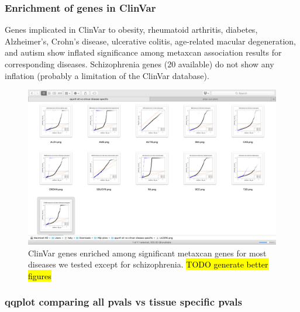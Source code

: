 \documentclass[10pt]{article}
\begin{document}


\subsubsection*{Enrichment of genes in ClinVar}

Genes implicated in ClinVar to obesity, rheumatoid arthritis, diabetes, Alzheimer's, Crohn's disease, ulcerative colitis, age-related macular degeneration, and autism show inflated significance among metaxcan association results for corresponding diseases. Schizophrenia genes (20 available) do not show any inflation (probably a limitation of the ClinVar database).
\begin{figure}
\includegraphics[width=\textwidth]{plots/Fig8-clinvar-vs-metaxcan.png}
\caption{ClinVar genes enriched among significant metaxcan genes for most diseases we tested except for schizophrenia. \hl{TODO generate better figures}}
\label{fig:clinvar}
\end{figure}

\subsubsection*{qqplot comparing all pvals vs tissue specific pvals}
\end{document}
